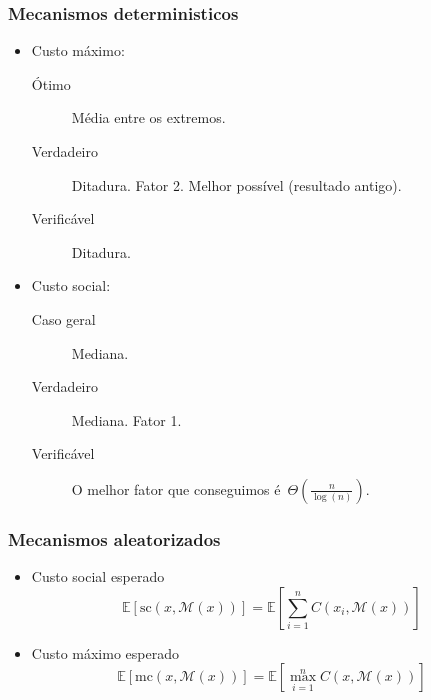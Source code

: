 \documentclass[usenames,dvipsnames]{beamer}
\begin{document}
\begin{frame}
\frametitle{Mecanismos deterministicos}

\begin{itemize}
\item Custo máximo:
\begin{description}
\item [Ótimo] Média entre os extremos.
\item [Verdadeiro] Ditadura. Fator 2. Melhor possível (resultado antigo).
\item [Verificável] Ditadura.
\end{description}
\item Custo social:
\begin{description}
\item [Caso geral] Mediana.
\item [Verdadeiro] Mediana. Fator 1.
\item [Verificável] O melhor fator que conseguimos é~$\Theta\left(\frac{n}{\log(n)}\right)$.
\end{description}
\end{itemize}
\end{frame}

%

\begin{frame}
\frametitle{Mecanismos aleatorizados}

\begin{itemize}
\item Custo social esperado\\ $$\mathbb{E}[ \text{sc}(x,\mathcal{M}(x)) ] = \mathbb{E}\left[ \sum\limits_{i=1}^n C(x_i,\mathcal{M}(x)) \right]$$
\item Custo máximo esperado\\ $$\mathbb{E}[ \text{mc}(x,\mathcal{M}(x)) ] = \mathbb{E}\left[ \max\limits_{i=1}^n C(x,\mathcal{M}(x)) \right]$$
\end{itemize}

\end{frame}
\end{document}
